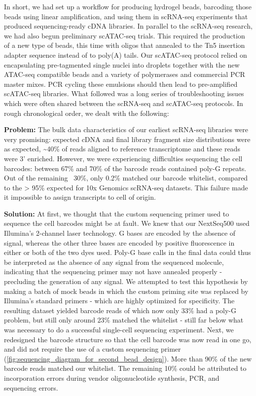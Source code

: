 In short, we had set up a workflow for producing hydrogel beads, barcoding those beads using linear amplification, and using them in scRNA-seq experiments that produced sequencing-ready cDNA libraries. In parallel to the scRNA-seq research, we had also begun preliminary scATAC-seq trials. This required the production of a new type of beads, this time with oligos that annealed to the Tn5 insertion adapter sequence instead of to poly(A) tails. Our scATAC-seq protocol relied on encapsulating pre-tagmented single nuclei into droplets together with the new ATAC-seq compatible beads and a variety of polymerases and commercial PCR master mixes. PCR cycling these emulsions should then lead to pre-amplified scATAC-seq libraries. What followed was a long series of troubleshooting issues which were often shared between the scRNA-seq and scATAC-seq protocols. In rough chronological order, we dealt with the following:

\textbf{Problem:} The bulk data characteristics of our earliest scRNA-seq libraries were very promising: expected cDNA and final library fragment size distributions were as expected, \textasciitilde{40}\% of reads aligned to reference transcriptome and these reads were 3' enriched. However, we were experiencing difficulties sequencing the cell barcodes: between 67\% and 70\% of the barcode reads contained poly-G repeats. Out of the remaining ~30\%, only 0.2\% matched our barcode whitelist, compared to the > 95\% expected for 10x Genomics scRNA-seq datasets. This failure made it impossible to assign transcripts to cell of origin.

\textbf{Solution:} At first, we thought that the custom sequencing primer used to sequence the cell barcodes might be at fault. We knew that our NextSeq500 used Illumina's 2-channel laser technology. G bases are encoded by the absence of signal, whereas the other three bases are encoded by positive fluorescence in either or both of the two dyes used. Poly-G base calls in the final data could thus be interpreted as the absence of any signal from the sequenced molecule, indicating that the sequencing primer may not have annealed properly - precluding the generation of any signal. We attempted to test this hypothesis by making a batch of mock beads in which the custom priming site was replaced by Illumina's standard primers - which are highly optimized for specificity. The resulting dataset yielded barcode reads of which now only 33\% had a poly-G problem, but still only around 23\% matched the whitelist - still far below what was necessary to do a successful single-cell sequencing experiment. Next, we redesigned the barcode structure so that the cell barcode was now read in one go, and did not require the use of a custom sequencing primer (\autoref{fig:sequencing_diagram_for_second_bead_design}). More than 90\% of the new barcode reads matched our whitelist. The remaining 10\% could be attributed to incorporation errors during vendor oligonucleotide synthesis, PCR, and sequencing errors.

